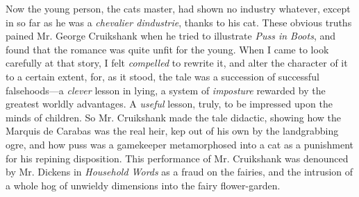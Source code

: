 \documentclass[14pt,a4paper]{memoir}
\begin{document}
{Now the \textquotesingle young person,\textquotesingle{} the
cat\textquotesingle s master, had shown no
\textquotesingle industry\textquotesingle{} whatever, except in so far
as he was a \emph{chevalier d\textquotesingle industrie}, thanks to his
cat. These obvious truths pained Mr. George Cruikshank when he tried to
illustrate \emph{Puss in Boots}, and found that the romance was quite
unfit for the young. \textquotesingle When I came to look carefully at
that story, I felt \emph{compelled} to rewrite it, and alter the
character of it to a certain extent, for, as it stood, the tale was a
succession of successful falsehoods---a \emph{clever} lesson in lying, a
system of \emph{imposture} rewarded by the greatest worldly advantages.
A \emph{useful} lesson, truly, to be impressed upon the minds of
children.\textquotesingle{} So Mr. Cruikshank made the tale didactic,
showing how the Marquis de Carabas was the real heir,
\textquotesingle kep\textquotesingle{} out of his own\textquotesingle{}
by the landgrabbing ogre, and how puss was a gamekeeper metamorphosed
into a cat as a punishment for his repining disposition. This
performance of Mr. Cruikshank was denounced by Mr. Dickens in
\emph{Household Words} as a \textquotesingle fraud on the
fairies,\textquotesingle{} and \textquotesingle the intrusion of a whole
hog of unwieldy dimensions into the fairy
flower-garden.\textquotesingle{}

}
\end{document}
